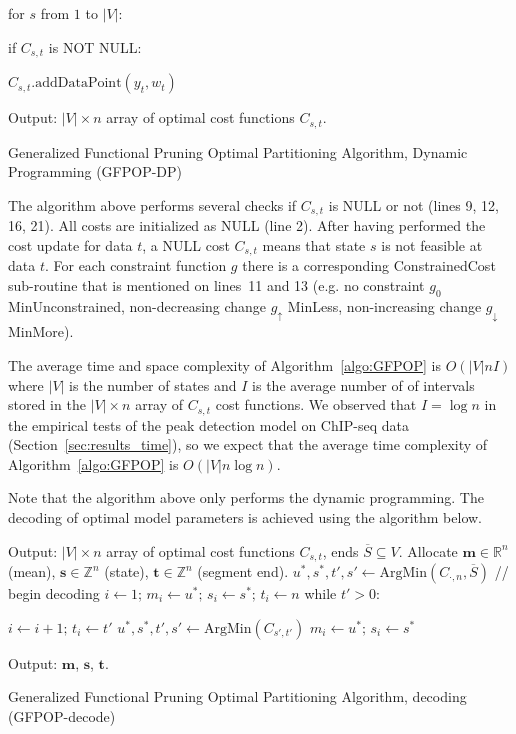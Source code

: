 \documentclass[article]{jss}
\newcommand{\ZZ}{\mathbb Z}
\newcommand{\RR}{\mathbb R}
\begin{document}
\begin{algorithm}
\begin{algorithmic}[1]
\begin{ALC@g}
\begin{ALC@g}
\begin{ALC@g}
    \end{ALC@g}
    \STATE for $s$ from $1$ to $|V|$:
    \begin{ALC@g}
      \STATE if $C_{s,t}$ is NOT NULL:
      \begin{ALC@g}
        \STATE $C_{s,t}\text{.addDataPoint}(y_t, w_t)$
      \end{ALC@g}
    \end{ALC@g}
  \end{ALC@g}
\end{ALC@g}
\STATE Output: $|V|\times n$ array of optimal cost functions $C_{s,t}$.
\caption{\label{algo:GFPOP}Generalized Functional Pruning Optimal
  Partitioning Algorithm, Dynamic Programming (GFPOP-DP)}
\end{algorithmic}
\end{algorithm}

The algorithm above performs several checks if $C_{s,t}$ is NULL or
not (lines 9, 12, 16, 21). All costs are initialized as NULL (line
2). After having performed the cost update for data $t$, a NULL cost
$C_{s,t}$ means that state $s$ is not feasible at data $t$. For each
constraint function $g$ there is a corresponding ConstrainedCost
sub-routine that is mentioned on lines~11 and 13 (e.g. no constraint
$g_0$ MinUnconstrained, non-decreasing change $g_\uparrow$ MinLess,
non-increasing change $g_\downarrow$ MinMore). 

The average time and space complexity of Algorithm~\ref{algo:GFPOP} is
$O(|V| n I)$ where $|V|$ is the number of states and $I$ is the
average number of of intervals stored in the $|V|\times n$ array of
$C_{s,t}$ cost functions. We observed that $I=\log n$ in the empirical
tests of the peak detection model on ChIP-seq data
(Section~\ref{sec:results_time}), so we expect that the average time
complexity of Algorithm~\ref{algo:GFPOP} is $O(|V| n\log n)$.

Note that the algorithm above only performs the dynamic
programming. The decoding of optimal model parameters is achieved
using the algorithm below.

\begin{algorithm}
\begin{algorithmic}[1]
\STATE Output: $|V|\times n$ array of optimal cost functions $C_{s,t}$, 
ends $\overline S\subseteq V$.
\STATE Allocate
$\mathbf m\in\RR^n$ (mean), 
$\mathbf s\in\ZZ^n$ (state), 
$\mathbf t\in\ZZ^n$ (segment end).
\STATE $u^*,s^*,t',s'\gets \text{ArgMin}(C_{\cdot,n}, \overline S)$ // begin decoding
\STATE $i\gets 1;\, m_{i}\gets u^*;\, s_i\gets s^*;\, t_{i}\gets n$
\STATE while $t' > 0$:
\begin{ALC@g}
  \STATE $i\gets i+1;\, t_{i}\gets t'$
  \STATE $u^*,s^*,t',s'\gets \text{ArgMin}(C_{s',t'})$
  \STATE $m_{i}\gets u^*;\, s_i\gets s^*$
\end{ALC@g}
\STATE Output: 
$\mathbf m$, 
$\mathbf s$, 
$\mathbf t$.
\caption{\label{algo:GFPOP-decode}Generalized Functional Pruning Optimal
  Partitioning Algorithm, decoding (GFPOP-decode)}
\end{algorithmic}
\end{algorithm}
\end{document}
